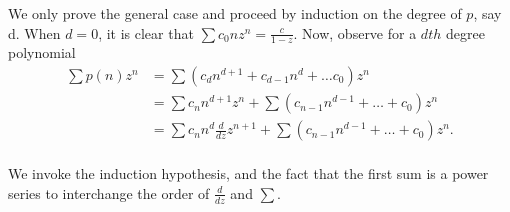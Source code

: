 \documentclass{homework}
\begin{document}

\begin{solution}
We only prove the general case and proceed by induction on the degree of $p$, say d.  When $d=0$, it is clear that $\sum c_0 n z^n = \frac c{1-z}$. Now, observe for a $dth$ degree polynomial
\begin{align*}
  \sum p(n) z^n 
  &=\sum \left(c_d n^{d+1} + c_{d-1} n^{d} + \dots c_0\right) z^n \\
  &= \sum c_n n^{d+1} z^n + \sum (c_{n-1} n^{d-1} + \dots + c_0) z^n \\
  &= \sum c_n n^{d} \frac d{dz} z^{n+1} + \sum (c_{n-1} n^{d-1} + \dots + c_0) z^n. \\
\end{align*}

We invoke the induction hypothesis, and the fact that the first sum is a power series to interchange the order of $\frac d{dz}$ and $\sum$.

\end{solution}
\end{document}

